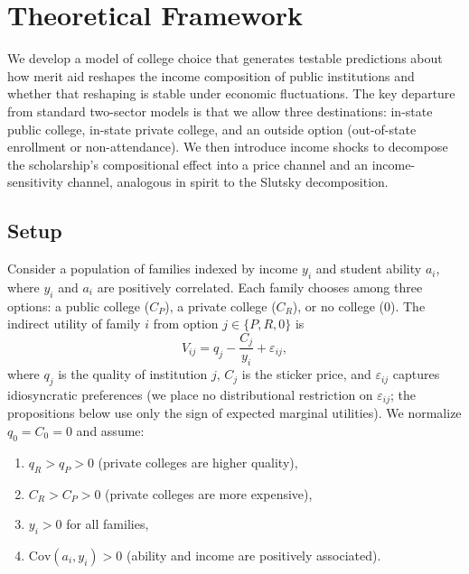 
\section{Theoretical Framework}
\label{sec:theory}

We develop a model of college choice that generates testable
predictions about how merit aid reshapes the income composition of
public institutions and whether that reshaping is stable under
economic fluctuations. The key departure from standard two-sector
models is that we allow three destinations: in-state public college,
in-state private college, and an outside option (out-of-state
enrollment or non-attendance). We then introduce income shocks to decompose the scholarship's
compositional effect into a price channel and an income-sensitivity
channel, analogous in spirit to the Slutsky decomposition.

\subsection{Setup}

Consider a population of families indexed by income $y_i$ and student
ability $a_i$, where $y_i$ and $a_i$ are positively correlated. Each
family chooses among three options: a public college ($C_P$), a private
college ($C_R$), or no college ($0$). The indirect utility of family
$i$ from option $j \in \{P, R, 0\}$ is
\begin{equation}
  V_{ij} = q_j - \frac{C_j}{y_i} + \varepsilon_{ij},
\end{equation}
where $q_j$ is the quality of institution $j$, $C_j$ is the sticker
price, and $\varepsilon_{ij}$ captures idiosyncratic preferences (we
place no distributional restriction on $\varepsilon_{ij}$; the
propositions below use only the sign of expected marginal utilities).
We normalize $q_0 = C_0 = 0$ and assume:
\begin{enumerate}
  \item $q_R > q_P > 0$ (private colleges are higher quality),
  \item $C_R > C_P > 0$ (private colleges are more expensive),
  \item $y_i > 0$ for all families,
  \item $\text{Cov}(a_i, y_i) > 0$ (ability and income are positively associated).
\end{enumerate}

